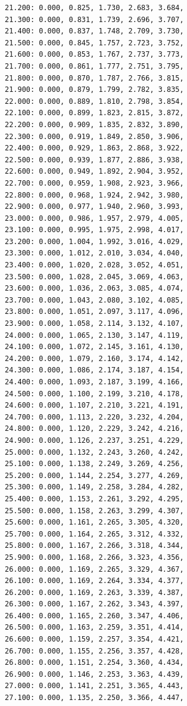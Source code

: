 \documentclass[12pt, a4paper]{article}
\begin{document}
\begin{scriptsize}
\begin{ttfamily}
\begin{lstlisting}
21.200: 0.000, 0.825, 1.730, 2.683, 3.684, 
21.300: 0.000, 0.831, 1.739, 2.696, 3.707, 
21.400: 0.000, 0.837, 1.748, 2.709, 3.730, 
21.500: 0.000, 0.845, 1.757, 2.723, 3.752, 
21.600: 0.000, 0.853, 1.767, 2.737, 3.773, 
21.700: 0.000, 0.861, 1.777, 2.751, 3.795, 
21.800: 0.000, 0.870, 1.787, 2.766, 3.815, 
21.900: 0.000, 0.879, 1.799, 2.782, 3.835, 
22.000: 0.000, 0.889, 1.810, 2.798, 3.854, 
22.100: 0.000, 0.899, 1.823, 2.815, 3.872, 
22.200: 0.000, 0.909, 1.835, 2.832, 3.890, 
22.300: 0.000, 0.919, 1.849, 2.850, 3.906, 
22.400: 0.000, 0.929, 1.863, 2.868, 3.922, 
22.500: 0.000, 0.939, 1.877, 2.886, 3.938, 
22.600: 0.000, 0.949, 1.892, 2.904, 3.952, 
22.700: 0.000, 0.959, 1.908, 2.923, 3.966, 
22.800: 0.000, 0.968, 1.924, 2.942, 3.980, 
22.900: 0.000, 0.977, 1.940, 2.960, 3.993, 
23.000: 0.000, 0.986, 1.957, 2.979, 4.005, 
23.100: 0.000, 0.995, 1.975, 2.998, 4.017, 
23.200: 0.000, 1.004, 1.992, 3.016, 4.029, 
23.300: 0.000, 1.012, 2.010, 3.034, 4.040, 
23.400: 0.000, 1.020, 2.028, 3.052, 4.051, 
23.500: 0.000, 1.028, 2.045, 3.069, 4.063, 
23.600: 0.000, 1.036, 2.063, 3.085, 4.074, 
23.700: 0.000, 1.043, 2.080, 3.102, 4.085, 
23.800: 0.000, 1.051, 2.097, 3.117, 4.096, 
23.900: 0.000, 1.058, 2.114, 3.132, 4.107, 
24.000: 0.000, 1.065, 2.130, 3.147, 4.119, 
24.100: 0.000, 1.072, 2.145, 3.161, 4.130, 
24.200: 0.000, 1.079, 2.160, 3.174, 4.142, 
24.300: 0.000, 1.086, 2.174, 3.187, 4.154, 
24.400: 0.000, 1.093, 2.187, 3.199, 4.166, 
24.500: 0.000, 1.100, 2.199, 3.210, 4.178, 
24.600: 0.000, 1.107, 2.210, 3.221, 4.191, 
24.700: 0.000, 1.113, 2.220, 3.232, 4.204, 
24.800: 0.000, 1.120, 2.229, 3.242, 4.216, 
24.900: 0.000, 1.126, 2.237, 3.251, 4.229, 
25.000: 0.000, 1.132, 2.243, 3.260, 4.242, 
25.100: 0.000, 1.138, 2.249, 3.269, 4.256, 
25.200: 0.000, 1.144, 2.254, 3.277, 4.269, 
25.300: 0.000, 1.149, 2.258, 3.284, 4.282, 
25.400: 0.000, 1.153, 2.261, 3.292, 4.295, 
25.500: 0.000, 1.158, 2.263, 3.299, 4.307, 
25.600: 0.000, 1.161, 2.265, 3.305, 4.320, 
25.700: 0.000, 1.164, 2.265, 3.312, 4.332, 
25.800: 0.000, 1.167, 2.266, 3.318, 4.344, 
25.900: 0.000, 1.168, 2.266, 3.323, 4.356, 
26.000: 0.000, 1.169, 2.265, 3.329, 4.367, 
26.100: 0.000, 1.169, 2.264, 3.334, 4.377, 
26.200: 0.000, 1.169, 2.263, 3.339, 4.387, 
26.300: 0.000, 1.167, 2.262, 3.343, 4.397, 
26.400: 0.000, 1.165, 2.260, 3.347, 4.406, 
26.500: 0.000, 1.163, 2.259, 3.351, 4.414, 
26.600: 0.000, 1.159, 2.257, 3.354, 4.421, 
26.700: 0.000, 1.155, 2.256, 3.357, 4.428, 
26.800: 0.000, 1.151, 2.254, 3.360, 4.434, 
26.900: 0.000, 1.146, 2.253, 3.363, 4.439, 
27.000: 0.000, 1.141, 2.251, 3.365, 4.443, 
27.100: 0.000, 1.135, 2.250, 3.366, 4.447, 

\end{lstlisting}
\end{ttfamily}
\end{scriptsize}
\end{document}
